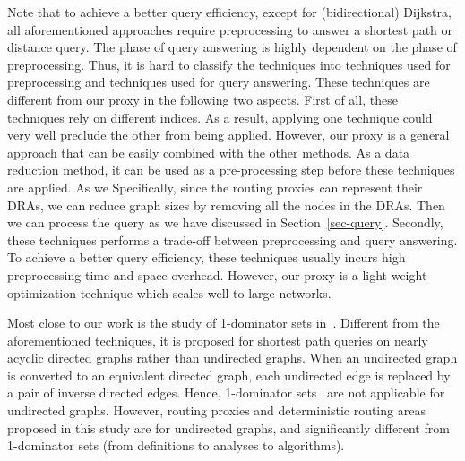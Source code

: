 Note that to achieve a better query efficiency, except for (bidirectional) Dijkstra, all aforementioned approaches require preprocessing to answer a shortest path or distance query. The phase of query answering is highly dependent on the phase of preprocessing. Thus, it is hard to classify the techniques into techniques used for preprocessing and techniques used for query answering. These techniques are different from our proxy in the following two aspects. First of all, these techniques rely on different indices. As a result, applying one technique could very well preclude the other from being applied. However, our proxy is a general approach that can be easily combined with the other methods. As a data reduction method, it can be used as a pre-processing step before these techniques are applied. As we Specifically, since the routing proxies can represent their DRAs, we can reduce graph sizes by removing all the nodes in the DRAs. Then we can process the query as we have discussed in Section~\ref{sec-query}. Secondly, these techniques performs a trade-off between preprocessing and query answering. To achieve a better query efficiency, these techniques usually incurs high preprocessing time and space overhead. However, our proxy is a light-weight optimization technique which scales well to large networks. 


Most close to our work is the study of 1-dominator sets in~\cite{SaundersT07}. Different from the aforementioned techniques, it is proposed for shortest path queries on nearly acyclic directed graphs rather than undirected graphs. When an undirected graph is converted to an equivalent directed graph, each undirected edge is replaced by a pair of inverse directed edges. Hence, 1-dominator sets~\cite{SaundersT07} are not applicable for undirected graphs. However, routing proxies and deterministic routing areas proposed in this study  are for undirected graphs,  and  significantly different from 1-dominator sets (from definitions to analyses to algorithms).








